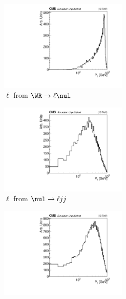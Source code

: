 
\clearpage

\begin{figure}
	\centering
	\begin{subfigure}[t]{2.4in}
		\centering
		\includegraphics[width=2.4in]{figures/ptMatchedRecoEleFromWr_mwr2200_mnu1100.pdf}
		\caption{$\ell$ from $\WR \rightarrow \ell\nul$}\label{fig:wrLeptJetPtsa}
	\end{subfigure}
	\thickspace
	\begin{subfigure}[t]{2.4in}
		\centering
		\includegraphics[width=2.4in]{figures/ptMatchedRecoEleFromNu_mwr2200_mnu1100.pdf}
		\caption{$\ell$ from $\nul \rightarrow \ell jj$}\label{fig:wrLeptJetPtsb}
	\end{subfigure}
	\newline
	\newline
	\newline
	\newline
	\begin{subfigure}[t]{2.4in}
		\centering
		\includegraphics[width=2.4in]{figures/ptMatchedRecoJetOne_mwr2200_mnu1100.pdf}

\end{subfigure}
\end{figure}
